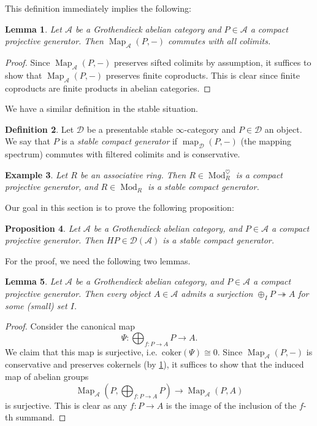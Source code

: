 \documentclass{article}
\theoremstyle{definition}
\newtheorem{defn}{Definition}[section]
\theoremstyle{definition}
\theoremstyle{definition}
\theoremstyle{plain}
\newtheorem{lem}[defn]{Lemma}
\theoremstyle{plain}
\theoremstyle{plain}
\theoremstyle{plain}
\theoremstyle{plain}
\theoremstyle{plain}
\newtheorem{prop}[defn]{Proposition}
\theoremstyle{plain}
\newtheorem{exmpl}[defn]{Example}
\theoremstyle{plain}
\theoremstyle{remark}
\theoremstyle{remark}
\theoremstyle{plain}
\theoremstyle{plain}
\theoremstyle{plain}
\theoremstyle{plain}
\theoremstyle{plain}
\newcommand{\Mod}[1]{\operatorname{Mod}_{#1}}
\newcommand{\ModDisc}[1]{\operatorname{Mod}_{#1}^{\heartsuit}}
\newcommand{\Cat}[1]{\mathcal{#1}}
\newcommand{\Map}[3]{\operatorname{Map}_{#1}({#2}, {#3})} %
\newcommand{\map}[3]{\operatorname{map}_{#1}({#2}, {#3})} %
\begin{document}
This definition immediately implies the following:
\begin{lem} \label{lem:cpgen:tiny}
    Let $\Cat A$ be a Grothendieck abelian category and $P \in \Cat A$ a compact projective generator.
    Then $\Map{\Cat A}{P}{-}$ commutes with all colimits.
\end{lem}
\begin{proof}
    Since $\Map{\Cat A}{P}{-}$ preserves sifted colimits by assumption,
    it suffices to show that $\Map{\Cat A}{P}{-}$ preserves finite coproducts.
    This is clear since finite coproducts are finite products in abelian categories.
\end{proof}

We have a similar definition in the stable situation.
\begin{defn} \label{defn:cpgen:stable-generator}
    Let $\Cat D$ be a presentable stable $\infty$-category and $P \in \Cat D$ an object.
    We say that $P$ is a \emph{stable compact generator}
    if $\map{\Cat D}{P}{-}$ (the mapping spectrum) commutes with filtered colimits and is conservative.
\end{defn}

\begin{exmpl}
    Let $R$ be an associative ring.
    Then $R \in \ModDisc{R}$ is a compact projective generator,
    and $R \in \Mod{R}$ is a stable compact generator.
\end{exmpl}

Our goal in this section is to prove the following proposition:
\begin{prop} \label{lem:cpgen:abelian-implies-stable}
    Let $\Cat A$ be a Grothendieck abelian category, and $P \in \Cat A$ 
    a compact projective generator.
    Then $HP \in \Cat D(\Cat A)$ is a stable compact generator.
\end{prop}

For the proof, we need the following two lemmas.

\begin{lem} \label{lem:cpgen:Tohoku-generator}
    Let $\Cat A$ be a Grothendieck abelian category, and $P \in \Cat A$ 
    a compact projective generator.
    Then every object $A \in \Cat A$ admits a surjection $\oplus_I P \twoheadrightarrow A$
    for some (small) set $I$.
\end{lem}
\begin{proof}
    Consider the canonical map 
    \begin{equation*}
        \Psi \colon \bigoplus_{f \colon P \to A} P \to A.
    \end{equation*}
    We claim that this map is surjective, i.e.\ $\mathrm{coker}(\Psi) \cong 0$.
    Since $\Map{\Cat A}{P}{-}$ is conservative and preserves cokernels (by \cref{lem:cpgen:tiny}),
    it suffices to show that the induced map of abelian groups
    \begin{equation*}
        \Map{\Cat A}{P}{\bigoplus_{f \colon P \to A} P} \to \Map{\Cat A}{P}{A}
    \end{equation*}
    is surjective.
    This is clear as any $f \colon P \to A$ 
    is the image of the inclusion of the $f$-th summand.
\end{proof}
\end{document}
